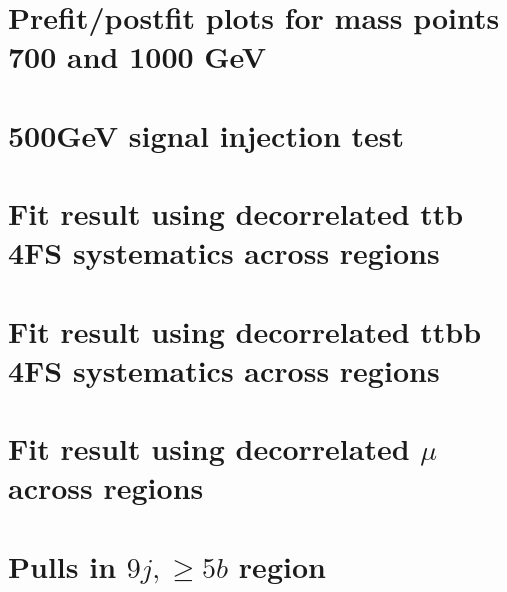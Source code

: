 \documentclass[NOTE, atlasdraft=true, texlive=2016, UKenglish]{atlasdoc}
\begin{document}
\FloatBarrier
\section{Prefit/postfit plots for mass points 700 and 1000 GeV}
\label{app:700_1000}


\FloatBarrier
\section{500GeV signal injection test}
\label{app:injection}


\FloatBarrier
\section{Fit result using decorrelated ttb 4FS systematics across regions}
\label{app:decorrelation_ttb_4FS}


\FloatBarrier
\section{Fit result using decorrelated ttbb 4FS systematics across regions}
\label{app:decorrelation_ttbb_4FS}


\FloatBarrier
\section{Fit result using decorrelated $\mu$ across regions}
\label{app:decorrelation_mu}


\FloatBarrier
\section{Pulls in $9j, \ge5b$ region}
\label{app:ljets_9jge5b_pull}
                                                                                                                                                         
\end{document}
